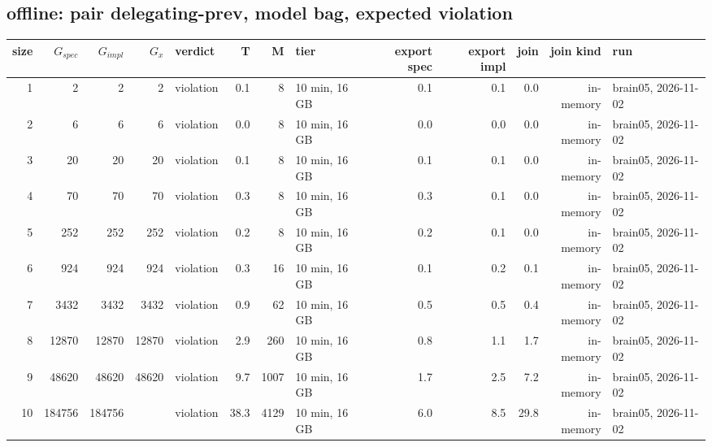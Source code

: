 \documentclass[10pt]{article}
\begin{document}
\subsection*{offline: pair \textsf{delegating-prev}, model bag, expected violation}
\begin{longtable}{@{}rrrrlrrlrrrrl@{}}
\toprule
size & $G_{\mathit{spec}}$ & $G_{\mathit{impl}}$ & $G_x$ & verdict & T & M & tier & export spec & export impl & join & join kind & run \\
\midrule
\endhead
\color{red} 1 & 2 & 2 & 2 & violation & 0.1 & 8 & 10 min, 16 GB & 0.1 & 0.1 & 0.0 & in-memory & brain05, 2026-11-02 \\
\color{red} 2 & 6 & 6 & 6 & violation & 0.0 & 8 & 10 min, 16 GB & 0.0 & 0.0 & 0.0 & in-memory & brain05, 2026-11-02 \\
\color{red} 3 & 20 & 20 & 20 & violation & 0.1 & 8 & 10 min, 16 GB & 0.1 & 0.1 & 0.0 & in-memory & brain05, 2026-11-02 \\
\color{red} 4 & 70 & 70 & 70 & violation & 0.3 & 8 & 10 min, 16 GB & 0.3 & 0.1 & 0.0 & in-memory & brain05, 2026-11-02 \\
\color{red} 5 & 252 & 252 & 252 & violation & 0.2 & 8 & 10 min, 16 GB & 0.2 & 0.1 & 0.0 & in-memory & brain05, 2026-11-02 \\
\color{red} 6 & 924 & 924 & 924 & violation & 0.3 & 16 & 10 min, 16 GB & 0.1 & 0.2 & 0.1 & in-memory & brain05, 2026-11-02 \\
\color{red} 7 & 3432 & 3432 & 3432 & violation & 0.9 & 62 & 10 min, 16 GB & 0.5 & 0.5 & 0.4 & in-memory & brain05, 2026-11-02 \\
\color{red} 8 & 12870 & 12870 & 12870 & violation & 2.9 & 260 & 10 min, 16 GB & 0.8 & 1.1 & 1.7 & in-memory & brain05, 2026-11-02 \\
\color{red} 9 & 48620 & 48620 & 48620 & violation & 9.7 & 1007 & 10 min, 16 GB & 1.7 & 2.5 & 7.2 & in-memory & brain05, 2026-11-02 \\
\color{red} 10 & 184756 & 184756 &  & violation & 38.3 & 4129 & 10 min, 16 GB & 6.0 & 8.5 & 29.8 & in-memory & brain05, 2026-11-02 \\
\bottomrule
\end{longtable}
\end{document}
